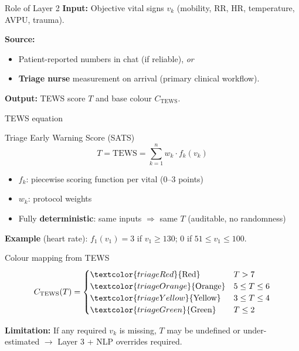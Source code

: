 \documentclass[aspectratio=169,11pt]{beamer}
\newcommand{\bcol}[2][blue!70!black]{\textcolor{#1}{#2}}
\begin{document}
\begin{frame}{Role of Layer 2}
	\textbf{Input:} Objective vital signs $v_k$ (mobility, RR, HR, temperature, AVPU, trauma).

	\textbf{Source:}
	\begin{itemize}
		\item Patient-reported numbers in chat (if reliable), \textit{or}
		\item \textbf{Triage nurse} measurement on arrival (primary clinical workflow).
	\end{itemize}

	\textbf{Output:} TEWS score $T$ and base colour $C_{\text{TEWS}}$.
\end{frame}

\begin{frame}{TEWS equation}
	\begin{block}{Triage Early Warning Score (SATS)}
		\[
		T = \mathrm{TEWS} = \sum_{k=1}^{n} w_k \cdot f_k(v_k)
		\]
	\end{block}
	\begin{itemize}
		\item $f_k$: piecewise scoring function per vital (0--3 points)
		\item $w_k$: protocol weights
		\item Fully \textbf{deterministic}: same inputs $\Rightarrow$ same $T$ (auditable, no randomness)
	\end{itemize}

	\vspace{0.2em}
	\textbf{Example} (heart rate): $f_1(v_1)=3$ if $v_1 \geq 130$; $0$ if $51 \leq v_1 \leq 100$.
\end{frame}

\begin{frame}{Colour mapping from TEWS}
	\[
	C_{\text{TEWS}}(T) = \begin{cases}
		\bcol[triageRed]{\text{Red}} & T > 7 \\
		\bcol[triageOrange]{\text{Orange}} & 5 \leq T \leq 6 \\
		\bcol[triageYellow]{\text{Yellow}} & 3 \leq T \leq 4 \\
		\bcol[triageGreen]{\text{Green}} & T \leq 2
	\end{cases}
	\]

	\vspace{0.3em}
	\textbf{Limitation:} If any required $v_k$ is missing, $T$ may be undefined or under-estimated $\rightarrow$ Layer 3 + NLP overrides required.
\end{frame}
\end{document}
